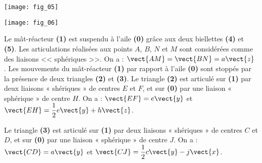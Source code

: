 \begin{multicols}{2}
\begin{multicols}{2}
 
\begin{center}
\texttt{[image: fig\_05]}
\end{center}

\begin{center}
\texttt{[image: fig\_06]}
\end{center}

Le mât-réacteur \textbf{(1)} est suspendu à l’aile \textbf{(0)} grâce aux deux biellettes \textbf{(4)} et \textbf{(5)}.
Les articulations réalisées aux points $A$, $B$, $N$ et $M$ sont considérées comme des liaisons << sphériques >>. On a : $\vect{AM}=\vect{BN}=a\vect{z}$ .
Les mouvements du mât-réacteur \textbf{(1)} par rapport à l’aile \textbf{(0)} sont stoppés par la présence de deux triangles \textbf{(2)} et \textbf{(3)}. Le triangle \textbf{(2)} est articulé sur \textbf{(1)} par deux liaisons « shériques » de centres $E$ et $F$, et sur \textbf{(0)} par une liaison « sphérique » de centre $H$. On a : $\vect{EF}=e\vect{y}$ et $\vect{EH}=\dfrac{1}{2}e\vect{y}+h\vect{z}$.

Le triangle \textbf{(3)} est articulé sur \textbf{(1)} par deux liaisons « shériques » de centres $C$ et $D$, et sur \textbf{(0)} par une liaison « sphérique » de centre $J$. On a : $\vect{CD}=a\vect{y}$  et  $\vect{CJ}=\dfrac{1}{2}c\vect{y}-j\vect{x}$.







\fi



\ifprof
\end{multicols}
\else
\end{multicols}
\fi

